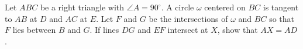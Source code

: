 Let $ABC$ be a right triangle with $\angle A= 90^{\circ}$.
A circle $\omega$ centered on $BC$ is tangent to $AB$ at $D$ and $AC$ at $E$.
Let $F$ and $G$ be the intersections of $\omega$ and $BC$ so that $F$ lies between $B$ and $G$.
If lines $DG$ and $EF$ intersect at $X$, show that $AX=AD$.
